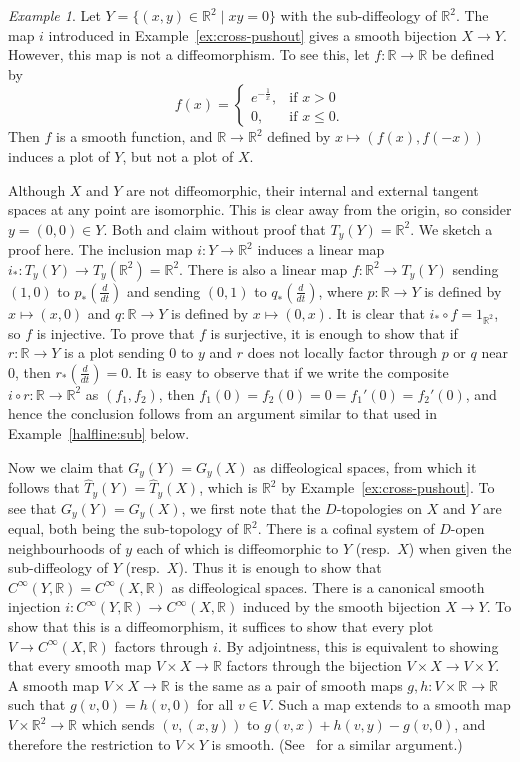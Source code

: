 \documentclass[12pt]{amsart}
\theoremstyle{remark}
\newtheorem{ex}[de]{Example}
\newcommand{\ra}{\to}
\def \R{\mathbb{R}}
\begin{document}
\begin{ex}\label{ex:cross-sub}
Let $Y=\{(x,y) \in \R^2 \mid xy=0\}$ with the sub-diffeology of $\R^2$.
The map $i$ introduced in Example~\ref{ex:cross-pushout} gives a smooth bijection $X \ra Y$.
However, this map is not a diffeomorphism.
To see this, let $f:\R \ra \R$ be defined by
\[
f(x)=\begin{cases} e^{-\frac{1}{x}}, & \textrm{if $x>0$} \\
                   0,                & \textrm{if $x \leq 0$.}
     \end{cases}
\]
Then $f$ is a smooth function, and $\R \ra \R^2$ defined by $x \mapsto (f(x),f(-x))$ induces a plot of $Y$, but not a plot of $X$.

Although $X$ and $Y$ are not diffeomorphic, their internal and
external tangent spaces at any point are isomorphic.
This is clear away from the origin, so consider
$y=(0,0) \in Y$.
Both \cite[Example~4.4(i)]{He} and \cite[Example~6.2]{HM} claim without proof that
$T_y(Y)=\R^2$.
We sketch a proof here.
The inclusion map $i:Y \ra \R^2$ induces a linear map $i_*:T_y(Y) \ra T_y(\R^2)=\R^2$.
There is also a linear map $f:\R^2 \ra T_y(Y)$ sending $(1,0)$ to $p_*(\frac{d}{dt})$
and sending $(0,1)$ to $q_*(\frac{d}{dt})$,
where $p:\R \ra Y$ is defined by $x \mapsto (x,0)$ and
$q:\R \ra Y$ is defined by $x \mapsto (0,x)$.
It is clear that $i_* \circ f=1_{\R^2}$, so $f$ is injective.
To prove that $f$ is surjective, it is enough to show that
if $r:\R \ra Y$ is a plot sending $0$ to $y$ and
$r$ does not locally factor through $p$ or $q$ near $0$, then $r_*(\frac{d}{dt})=0$.
It is easy to observe that if we write the composite $i \circ r:\R \ra \R^2$
as $(f_1,f_2)$, then $f_1(0)=f_2(0)=0=f_1'(0)=f_2'(0)$,
and hence the conclusion follows from an argument similar to that used in Example~\ref{halfline:sub} below.
%
%

Now we claim that $G_y(Y)=G_y(X)$ as diffeological spaces, from which it follows that
$\hat{T}_y(Y) = \hat{T}_y(X)$, which is $\R^2$ by Example~\ref{ex:cross-pushout}.
To see that $G_y(Y)=G_y(X)$, we first note that the $D$-topologies on $X$ and $Y$ are equal,
both being the sub-topology of $\R^2$.
There is a cofinal system of $D$-open neighbourhoods of $y$ each of which is
diffeomorphic to $Y$ (resp.\ $X$) when given the sub-diffeology of $Y$ (resp.\ $X$).
Thus it is enough to show that $C^\infty(Y,\R)=C^\infty(X,\R)$ as diffeological spaces.
There is a canonical smooth injection $i: C^\infty(Y,\R) \ra C^\infty(X,\R)$ induced by the smooth bijection $X \ra Y$.
To show that this is a diffeomorphism, it suffices to show that every plot $V \ra C^\infty(X,\R)$
factors through $i$.
By adjointness, this is equivalent to showing that every smooth map $V \times X \to \R$
factors through the bijection $V \times X \to V \times Y$.
A smooth map $V \times X \to \R$ is the same
as a pair of smooth maps $g, h : V \times \R \to \R$ such that $g(v,0) = h(v,0)$ for all $v \in V$.
Such a map extends to a smooth map $V \times \R^2 \to \R$ which sends
$(v, (x,y))$ to $g(v,x) + h(v,y) - g(v,0)$, and therefore the restriction to $V \times Y$
is smooth.
(See~\cite[Example 12(c)]{V} for a similar argument.)


\end{ex}
\end{document}
